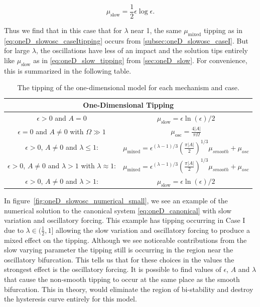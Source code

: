 \begin{equation*}
\mu_{\text{slow}}=\frac{1}{2}\epsilon\log\epsilon.
\end{equation*}

Thus we find that in this case that for $\lambda$ near 1, the same $\mu_{\text{mixed}}$ tipping as in \eqref{eq:oneD_slowosc_caseItipping} occurs from \autoref{subsec:oneD_slowosc_caseI}. But for large $\lambda$, the oscillations have less of an impact and the solution tips entirely like $\mu_{\text{slow}}$ as in \eqref{eq:oneD_slow_tipping} from \autoref{sec:oneD_slow}. For convenience, this is summarized in the following table.

\begin{center}
\begin{table}[H]\label{table:oneD_tipping}
\centering
\begin{tabular}{|c|c|}
\hline 
 \multicolumn{2}{|c|}{One-Dimensional Tipping} \\ 
\hline
$\epsilon>0$ and $A=0$ & $\mu_{\text{slow}}=\epsilon\ln(\epsilon)/2$ \\ 
\hline 
$\epsilon=0$ and $A\not=0$ with $\Omega\gg1$ & $\mu_{\text{osc}}=\frac{4|A|}{\pi \Omega}$\\ 
\hline 
$\epsilon>0$, $A\not=0$ and $\lambda\le 1$: & $\mu_{\text{mixed}}=\epsilon^{(\lambda-1)/3}\left(\frac{\pi |A|}{2}\right)^{1/3} \mu_{smooth}+\mu_{osc}$ \\ 
\hline 
$\epsilon>0$, $A\not=0$ and $\lambda> 1$ with $\lambda\approx 1$: & $\mu_{\text{mixed}}=\epsilon^{(\lambda-1)/3}\left(\frac{\pi |A|}{2}\right)^{1/3} \mu_{smooth}+\mu_{osc}$ \\
\hline
$\epsilon>0$, $A\not=0$ and $\lambda>1$: & $ \mu_{\text{slow}}=\epsilon\ln(\epsilon)/2$\\
\hline
\end{tabular} 
\caption{The tipping of the one-dimensional model for each mechanism and case.}
\end{table}
\end{center}

In figure~\ref{fig:oneD_slowosc_numerical_small}, we see an example of the numerical solution to the canonical system \eqref{eq:oneD_canonical} with slow variation and oscillatory forcing. This example has tipping occurring in Case I due to $\lambda\in (\frac{1}{2},1]$ allowing the slow variation and oscillatory forcing to produce a mixed effect on the tipping. Although we see noticeable contributions from the slow varying parameter the tipping still is occurring in the region near the oscillatory bifurcation. This tells us that for these choices in the values the strongest effect is the oscillatory forcing. It is possible to find values of $\epsilon$, $A$ and $\lambda$ that cause the non-smooth tipping to occur at the same place as the smooth bifurcation. This in theory, would eliminate the region of bi-stability and destroy the hysteresis curve entirely for this model.

